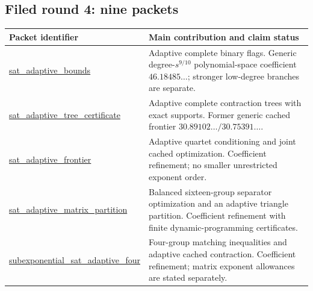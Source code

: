 \subsection*{Filed round 4: nine packets}
\begin{longtable}{>{\raggedright\arraybackslash}p{4.9cm}>{\raggedright\arraybackslash}p{10cm}}
\toprule Packet identifier & Main contribution and claim status\\
\midrule\endhead
\bottomrule\endfoot
\href{https://github.com/VladimirReshetnikov/ProveIt/tree/8e76d515063c4b9fbd8743a846b457e3a01bc039/Computability/SubexponentialSAT/Research/sat_adaptive_bounds}{\textsf{sat\_\allowbreak adaptive\_\allowbreak bounds}} & Adaptive complete binary flags. Generic degree-$s^{9/10}$ polynomial-space coefficient $46.18485\ldots$; stronger low-degree branches are separate.\\[3pt]
\href{https://github.com/VladimirReshetnikov/ProveIt/tree/8e76d515063c4b9fbd8743a846b457e3a01bc039/Computability/SubexponentialSAT/Research/sat_adaptive_tree_certificate}{\textsf{sat\_\allowbreak adaptive\_\allowbreak tree\_\allowbreak certificate}} & Adaptive complete contraction trees with exact supports. Former generic cached frontier $30.89102\ldots/30.75391\ldots$.\\[3pt]
\href{https://github.com/VladimirReshetnikov/ProveIt/tree/8e76d515063c4b9fbd8743a846b457e3a01bc039/Computability/SubexponentialSAT/Research/sat_adaptive_frontier}{\textsf{sat\_\allowbreak adaptive\_\allowbreak frontier}} & Adaptive quartet conditioning and joint cached optimization. Coefficient refinement; no smaller unrestricted exponent order.\\[3pt]
\href{https://github.com/VladimirReshetnikov/ProveIt/tree/8e76d515063c4b9fbd8743a846b457e3a01bc039/Computability/SubexponentialSAT/Research/sat_adaptive_matrix_partition}{\textsf{sat\_\allowbreak adaptive\_\allowbreak matrix\_\allowbreak partition}} & Balanced sixteen-group separator optimization and an adaptive triangle partition. Coefficient refinement with finite dynamic-programming certificates.\\[3pt]
\href{https://github.com/VladimirReshetnikov/ProveIt/tree/8e76d515063c4b9fbd8743a846b457e3a01bc039/Computability/SubexponentialSAT/Research/subexponential_sat_adaptive_four}{\textsf{subexponential\_\allowbreak sat\_\allowbreak adaptive\_\allowbreak four}} & Four-group matching inequalities and adaptive cached contraction. Coefficient refinement; matrix exponent allowances are stated separately.\\[3pt]

\end{longtable}
